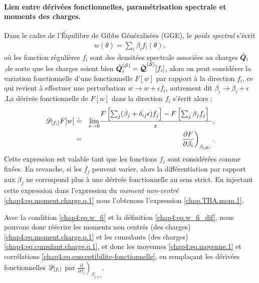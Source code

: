 \paragraph{Lien entre dérivées fonctionnelles, paramétrisation spectrale et moments des charges.}

Dans le cadre de l'Équilibre de Gibbs Généralisées (GGE), le {\em poids spectral} s'écrit 
\begin{eqnarray}\label{chap4:eq.w_fi}
	w(\theta) = \sum_i \beta_i f_i(\theta),	
\end{eqnarray}
où les fonction régulières $f_i$ sont des densitées spectrale associées au charges $\hat{\bm{Q}}_i$,de sorte que les charges soient bien $\hat{\bm{Q}}_i^{(\mathcal{S})} = \hat{\bm{\mathcal{Q}}}^{(\mathcal{S})}[f_i] $, alors on peut considérer la variation fonctionnelle d'une fonctionnelle $F[w]$ par rapport à la direction $f_i$, ce qui revient à effectuer une perturbation $w \rightarrow w + \epsilon f_i$, autrement dit $\beta_i \rightarrow \beta_i + \epsilon$.La dérivée fonctionnelle de $F[w]$ dans la direction $f_i$ s’écrit alors :
\begin{eqnarray}\label{chap4:eq.w_fi_dif}
	\dfonc{f_i} F[w]  &\doteq &  \underset{\epsilon \to 0 }{ \lim  } \frac{ F\left[\sum_j ( \beta_j + \delta_{ij} \epsilon) f_j \right]  - F \left[\sum_j  \beta_j f_j\right] }{\epsilon},\\
	& = & \left. \frac{ \partial F}{ \partial \beta_i } \right)_{\beta_{j\neq i} }.	
\end{eqnarray}
Cette expression est valable tant que les fonctions $f_j$ sont considérées comme fixées. En revanche, si les $f_j$ peuvent varier, alors la différentiation par rapport aux $\beta_j$ ne correspond plus à une dérivée fonctionnelle au sens strict.
En injectant cette expression dans l'expression du {\em moment non-centré} \eqref{chap4:eq.moment.charge.q.1} nous l'obtenons l'expression \eqref{chap.TBA.mom.1}. %

\medskip

Avec la condition \eqref{chap4:eq.w_fi} et la définition \eqref{chap4:eq.w_fi_dif}, nous pouvons donc réécrire les moments non centrés (des charges) \eqref{chap4:eq.moment.charge.q.1} et les cumulants (des charges) \eqref{chap4:eq.cumulant.charge.q.1}, et donc les moyennes \eqref{chap4:eq.moyenne.1} et corrélations \eqref{chap4:eq.susceptibilite-fonctionnelle}, en remplaçant les dérivées fonctionnelles $\mathscr{D}_{[f_i]}$ par $\left. \frac{ \partial}{ \partial \beta_i } \right)_{\beta_{j\neq i}}$.

